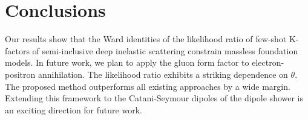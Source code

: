 \section{Conclusions}\label{sec:conclusions}

Our results show that the Ward identities of the likelihood ratio of
few-shot K-factors of semi-inclusive deep inelastic scattering constrain
massless foundation models. In future work, we plan to apply the gluon
form factor to electron-positron annihilation. The likelihood ratio
exhibits a striking dependence on $\theta$. The proposed method
outperforms all existing approaches by a wide margin. Extending this
framework to the Catani-Seymour dipoles of the dipole shower is an
exciting direction for future work.

